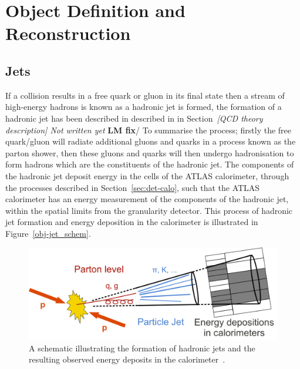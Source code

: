 \chapter{Object Definition and Reconstruction}
\label{sec:obj}

\section{Jets}
\label{sec:obj-jets}

If a collision results in a free quark or gluon in its final state then a stream of high-energy hadrons is known as a hadronic jet is formed,
the formation of a hadronic jet has been described in described in  in Section~\textit{[QCD theory description] Not written yet} \textbf{LM fix}/
To summarise the process; firstly the free quark/gluon will radiate additional gluons and quarks in a process known as the parton shower,
then these gluons and quarks will then undergo hadronisation to form hadrons which are the constituents of the hadronic jet.
The components of the hadronic jet deposit energy in the cells of the ATLAS calorimeter, through the processes described in Section~\ref{sec:det-calo},
such that the ATLAS calorimeter has an energy measurement of the components of the hadronic jet, within the spatial limits from the granularity detector.
This process of hadronic jet formation and energy deposition in the calorimeter is illustrated in Figure~\ref{obj-jet_schem}. \\

\begin{figure}[!ht]
  \begin{center}
    \includegraphics[width=1\linewidth, angle=0]{figs/Objects/jet_schem.png}
  \end{center}
  \caption[A schematic illustrating the formation of hadronic jets and the resulting observed energy deposits in the calorimeter.]
          {A schematic illustrating the formation of hadronic jets and the resulting observed energy deposits in the calorimeter~\cite{obj-jet_schem}.}
  \label{fig:obj-jet_schem}
\end{figure}

